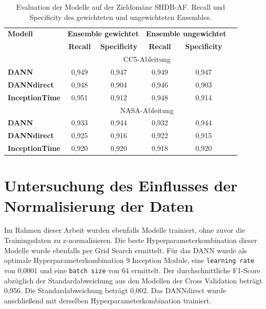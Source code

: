 \begin{table}[h!]
\centering
\caption[Recall und Specificity SHDB-AF]{Evaluation der Modelle auf der Zieldomäne \gls{SHDB-AF}. Recall und Specificity des gewichteten und ungewichteten Ensembles. }
\label{tab:sens_shdb}
\begin{tabular}{lccccc}
\toprule
\textbf{Modell}     & \multicolumn{2}{c}{\textbf{Ensemble gewichtet}} & \multicolumn{2}{c}{\textbf{Ensemble ungewichtet}}\\
						& \textbf{Recall} & \textbf{Specificity}  & \textbf{Recall} & \textbf{Specificity}\\  
\midrule
					   & \multicolumn{4}{c}{{CC5-Ableitung}} \\ 
\cmidrule(lr){2-5}
\textbf{DANN} 			& 0,949  & 0,947  & 0,949 & 0,947  \\
\textbf{DANNdirect}     & 0,948  & 0,904  & 0,946 & 0,903  \\
\textbf{InceptionTime}  & 0,951  & 0,912  & 0,948 & 0,914  \\
\midrule
					   & \multicolumn{4}{c}{{NASA-Ableitung}} \\ 
\cmidrule(lr){2-5}
\textbf{DANN} 			& 0,933  & 0,944  & 0,932 & 0,944  \\
\textbf{DANNdirect}     & 0,925  & 0,916  & 0,922 & 0,915  \\
\textbf{InceptionTime}  & 0,920  & 0,920  & 0,918 & 0,920  \\

\bottomrule
\end{tabular}
\end{table}

\section{Untersuchung des Einflusses der Normalisierung der Daten }\label{sec:nichtnormalisiert}

Im Rahmen dieser Arbeit wurden ebenfalls Modelle trainiert, ohne zuvor die Trainingsdaten zu z-normalisieren. Die beste Hyperparameterkombination dieser Modelle wurde ebenfalls per Grid Search ermittelt. Für das \gls{DANN} wurde als optimale Hyperparameterkombination 9 Inception Module, eine \texttt{learning rate} von 0,0001 und eine \texttt{batch size} von 64 ermittelt. Der durchschnittliche F1-Score abzüglich der Standardabweichung aus den Modellen der Cross Validation beträgt 0,956. Die Standardabweichung beträgt 0,002. Das DANNdirect wurde anschließend mit derselben Hyperparameterkombination trainiert.

